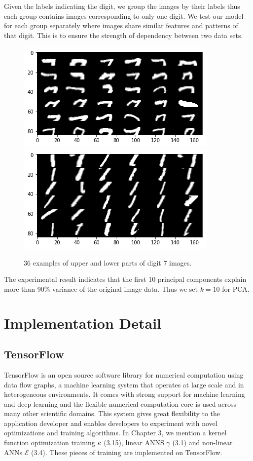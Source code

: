 \documentclass[12pt]{report} %
\begin{document}
Given the labels indicating the digit, we group the images by their labels thus each group contains images corresponding to only one digit. We test our model for each group separately where images share similar features and patterns of that digit. This is to ensure the strength of dependency between two data sets.
\begin{figure}[H]
	\centering
	\includegraphics[scale=0.9]{pictures/MNIST_up.png}
	\includegraphics[scale=0.9]{pictures/MNIST_down.png}
	\caption{36 examples of upper and lower parts of digit 7 images.}
	\label{fig:2}
\end{figure}
The experimental result indicates that the first 10 principal components explain more than 90\% variance of the original image data. Thus we set $k=10$ for PCA.

\section{Implementation Detail}
\subsection{TensorFlow}
TensorFlow\cite{TF, TF2} is an open source software library for numerical computation using data flow graphs, a machine learning system that operates at large scale and in heterogeneous environments. It comes with strong support for machine learning and deep learning and the flexible numerical computation core is used across many other scientific domains. This system gives great flexibility to the application developer and enables developers to experiment with novel optimizations and training algorithms. In Chapter 3, we mention a kernel function optimization training $\kappa$ (3.15), linear ANNS $\gamma$ (3.1) and non-linear ANNs $\mathcal{E}$ (3.4). These pieces of training are implemented on TensorFlow. 
\end{document}
